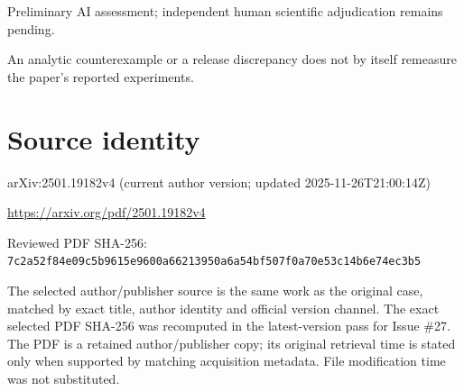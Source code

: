 \documentclass[11pt]{article}
\begin{document}
Preliminary AI assessment; independent human scientific adjudication remains pending.\par

An analytic counterexample or a release discrepancy does not by itself remeasure the paper’s reported experiments.\par

\section*{Source identity}

arXiv:2501.19182v4 (current author version; updated 2025-11-26T21:00:14Z)

\url{https://arxiv.org/pdf/2501.19182v4}

Reviewed PDF SHA-256: \nolinkurl{7c2a52f84e09c5b9615e9600a66213950a6a54bf507f0a70e53c14b6e74ec3b5}

The selected author/publisher source is the same work as the original case, matched by exact title, author identity and official version channel. The exact selected PDF SHA-256 was recomputed in the latest-version pass for Issue \#27. The PDF is a retained author/publisher copy; its original retrieval time is stated only when supported by matching acquisition metadata. File modification time was not substituted.
\end{document}
